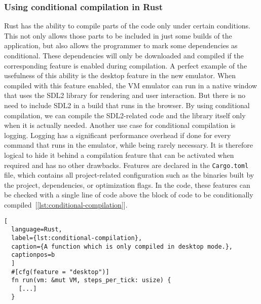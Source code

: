 \subsubsection{Using conditional compilation in Rust} \label{conditional-compilation}
Rust has the ability to compile parts of the code only under certain conditions.
This not only allows those parts to be included in just some builds of the application, but also allows the programmer to mark some dependencies as conditional.
These dependencies will only be downloaded and compiled if the corresponding feature is enabled during compilation.
A perfect example of the usefulness of this ability is the desktop feature in the new emulator.
When compiled with this feature enabled, the VM emulator can run in a native window that uses the SDL2 library for rendering and user interaction.
But there is no need to include SDL2 in a build that runs in the browser.
By using conditional compilation, we can compile the SDL2-related code and the library itself only when it is actually needed.
Another use case for conditional compilation is logging.
Logging has a significant performance overhead if done for every command that runs in the emulator, while being rarely necessary.
It is therefore logical to hide it behind a compilation feature that can be activated when required and has no other drawbacks.
Features are declared in the \verb+Cargo.toml+ file, which contains all project-related configuration such as the binaries built by the project, dependencies, or optimization flags.
In the code, these features can be checked with a single line of code above the block of code to be conditionally compiled~[\ref{lst:conditional-compilation}].

\begin{lstlisting}[
  language=Rust,
  label={lst:conditional-compilation},
  caption={A function which is only compiled in desktop mode.},
  captionpos=b
  ]
  #[cfg(feature = "desktop")]
  fn run(vm: &mut VM, steps_per_tick: usize) {
    [...]
  }
\end{lstlisting}

